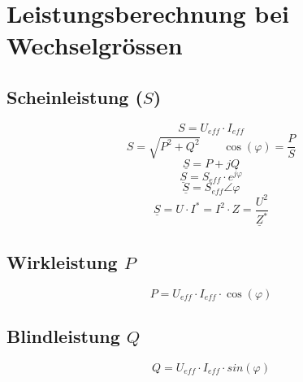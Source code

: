 



\section{Leistungsberechnung bei Wechselgrössen}

\subsection{Scheinleistung ($S$)}
\[ S = U_{eff} \cdot I_{eff} \]
\[ S = \sqrt{P^2 + Q^2} \qquad \cos(\varphi) = \frac{P}{S} \]
\[ \underline{S} = P + j Q \]
\[ \underline{S} = S_{eff} \cdot e^{j\varphi} \]
\[ \underline{S} = S_{eff} \angle \varphi \]
\[ \underline{S} = U \cdot I^* = I^2 \cdot Z = \frac{U^2}{\underline{Z}^*} \]

\subsection{Wirkleistung $P$}
\[ P = U_{eff} \cdot I_{eff} \cdot \cos(\varphi) \]

\subsection{Blindleistung $Q$}
\[ Q = U_{eff} \cdot I_{eff} \cdot sin(\varphi) \]
